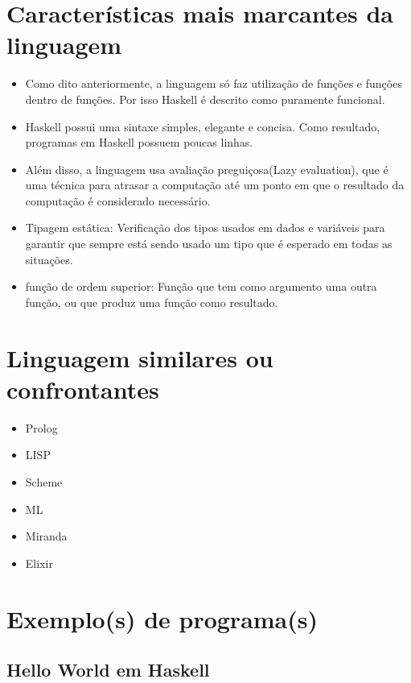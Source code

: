 \documentclass[
  article,			       %
  12pt,				         %
  oneside,			       %
  a4paper,			       %
  english,		       	 %
  brazil,			      	 %
  sumario=tradicional
]{abntex2}
\begin{document}
    \chapter{Características mais marcantes da linguagem}

    \begin{itemize}
      \item Como dito anteriormente, a linguagem só faz utilização de funções e funções dentro de funções. Por isso
      Haskell é descrito como puramente funcional.
      \item Haskell possui uma sintaxe simples, elegante e concisa. Como resultado, programas em Haskell possuem 
      poucas linhas. 
      \item Além disso, a linguagem usa avaliação preguiçosa(Lazy evaluation), que é uma técnica para atrasar a computação 
      até um ponto em que o resultado da computação é considerado necessário.
      \item Tipagem estática: Verificação dos tipos usados em dados e variáveis para 
      garantir que sempre está sendo usado um tipo que é esperado em todas as situações. 
      \item função de ordem superior: Função que tem como argumento uma outra função, ou que produz 
      uma função como resultado.
    \end{itemize}

    \newpage 

    \chapter{Linguagem similares ou confrontantes}

    \begin{itemize}
      \item Prolog
      \item LISP 
      \item Scheme 
      \item ML 
      \item Miranda 
      \item Elixir 
    \end{itemize}

    \newpage

    \chapter{Exemplo(s) de programa(s)}

    \section{Hello World em Haskell}
      
\end{document}
